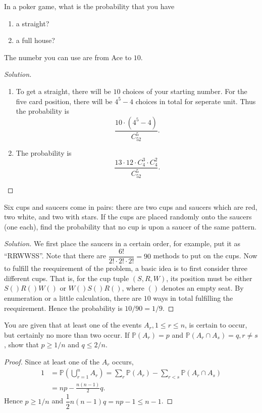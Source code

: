 \documentclass[11pt,singlecolumn, openany, citestyle=authoryear]{elegantbook}
\begin{document}
\begin{CJK}{UTF8}{gbsn}
\begin{example}
    In a poker game, what is the probability that you have 
    \begin{enumerate}
        \item a straight?
        \item a full house?
    \end{enumerate}
    The numebr you can use are from Ace to $10$. 
\end{example}
\begin{proof}[Solution]
\begin{enumerate}
    \item To get a straight, there will be $10$ choices of your starting number. 
    For the five card position, there will be $4^5-4$ choices in total for seperate 
    unit. Thus the probability is 
    $$
    \dfrac{10\cdot (4^5-4)}{C_{52}^5}.
    $$
    \item
    The probability is 
    $$
    \dfrac{13\cdot 12 \cdot C_4^3 \cdot C_4^2}{C_{52}^{5}}.
    $$
\end{enumerate}
\end{proof}

\begin{exercise}
    Six cups and saucers come in pairs: there are two cups and saucers which are red, 
    two white, and two with stars. If the cups are placed randomly onto the saucers 
    (one each), find the probability that no cup is upon a saucer of the same pattern.
\end{exercise}
\begin{proof}[Solution]
    We first place the saucers in a certain order, for example, put it as ``RRWWSS''.
    Note that there are $\dfrac{6!}{2! \cdot 2! \cdot 2!}=90$ methods to put on the cups.
    Now to fulfill the reequirement of the problem, a basic idea is to first consider
    three different cups. That is, for the cup tuple $(S,R,W)$, its position must be 
    either $S()R()W()$ or $W()S()R()$, where $()$ denotes an empty seat. By enumeration or 
    a little calculation, there are $10$ ways in total fulfilling the reequirement. Hence 
    the probability is $10/90=1/9$.
\end{proof}


\begin{exercise}
    You are given that at least one of the events $A_r, 1 \leqslant r \leqslant n$, is certain 
    to occur, but certainly no more than two occur. If $\mathbb{P}(A_r)=p$ and $\mathbb{P}(A_r \cap A_s)=q,
    r \neq s$, show that $p \geqslant 1/n$ and $q \leqslant 2/n$.
\end{exercise}
\begin{proof}
    Since at least one of the $A_r$ occurs,
    \begin{align*}
        1 & = \mathbb{P}(\bigcup_{r=1}^nA_r) = \sum_{r}\mathbb{P}(A_r)-
        \sum_{r < s}\mathbb{P}(A_r \cap A_s) \\
        & = np - \frac{n(n-1)}{2}q.
    \end{align*}
    Hence $p \geqslant 1/n$ and $\dfrac{1}{2}n(n-1)q=np-1\leqslant n-1$.
\end{proof}


\end{CJK}
\end{document}
